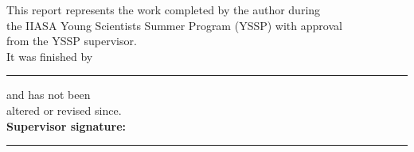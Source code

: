 \begin{titlepage}
\begin{flushleft}
	\small This report represents the work completed by the author during\\ 
	the IIASA Young Scientists Summer Program (YSSP) with approval \\
	from the YSSP supervisor. \\
	\vspace*{0.2in}
	\small It was finished by \rule{1.5in}{0.1mm} and has not been \\altered or revised since.\\
	\vspace*{0.2in}
	{\large \textbf {Supervisor signature:}}\\
	\vspace*{0.1in}
	\rule{2.5in}{0.1mm}\\
	

	\end{flushleft}


	
\end{titlepage}


